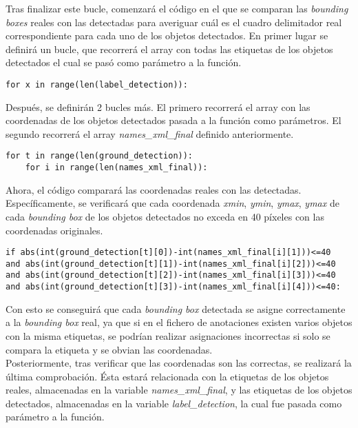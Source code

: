 \documentclass[a4paper, 12pt, spanish, chapterprefix, numbers=noenddot]{book}
\begin{document}
Tras finalizar este bucle, comenzará el código en el que se comparan las \textit{bounding boxes} reales con las detectadas para averiguar cuál es el cuadro delimitador real correspondiente para cada uno de los objetos detectados. En primer lugar se definirá un bucle, que recorrerá el array con todas las etiquetas de los objetos detectados el cual se pasó como parámetro a la función.\\

\begin{lstlisting}[frame=single]
for x in range(len(label_detection)):
\end{lstlisting}

Después, se definirán 2 bucles más. El primero recorrerá el array con las  coordenadas de los objetos detectados pasada a la función como parámetros. El segundo recorrerá el array \textit{names\_xml\_final} definido anteriormente.\\

\begin{lstlisting}[frame=single]
for t in range(len(ground_detection)):
	for i in range(len(names_xml_final)):
\end{lstlisting}

Ahora, el código comparará las coordenadas reales con las detectadas. Específicamente, se verificará que cada coordenada \textit{xmin}, \textit{ymin}, \textit{ymax}, \textit{ymax} de cada \textit{bounding box} de los objetos detectados no exceda en 40 píxeles con las coordenadas originales.\\

\begin{lstlisting}[frame=single]
if abs(int(ground_detection[t][0])-int(names_xml_final[i][1]))<=40
and abs(int(ground_detection[t][1])-int(names_xml_final[i][2]))<=40
and abs(int(ground_detection[t][2])-int(names_xml_final[i][3]))<=40
and abs(int(ground_detection[t][3])-int(names_xml_final[i][4]))<=40:
\end{lstlisting}

Con esto se conseguirá que cada \textit{bounding box} detectada se asigne correctamente a la \textit{bounding box} real, ya que si en el fichero de anotaciones existen varios objetos con la misma etiquetas, se podrían realizar asignaciones incorrectas si solo se compara la etiqueta y se obvian las coordenadas.\\

Posteriormente, tras verificar que las coordenadas son las correctas, se realizará la última comprobación. Ésta estará relacionada con la etiquetas de los objetos reales, almacenadas en la variable \textit{names\_xml\_final}, y las etiquetas de los objetos detectados, almacenadas en la variable \textit{label\_detection}, la cual fue pasada como parámetro a la función.\\
\end{document}
